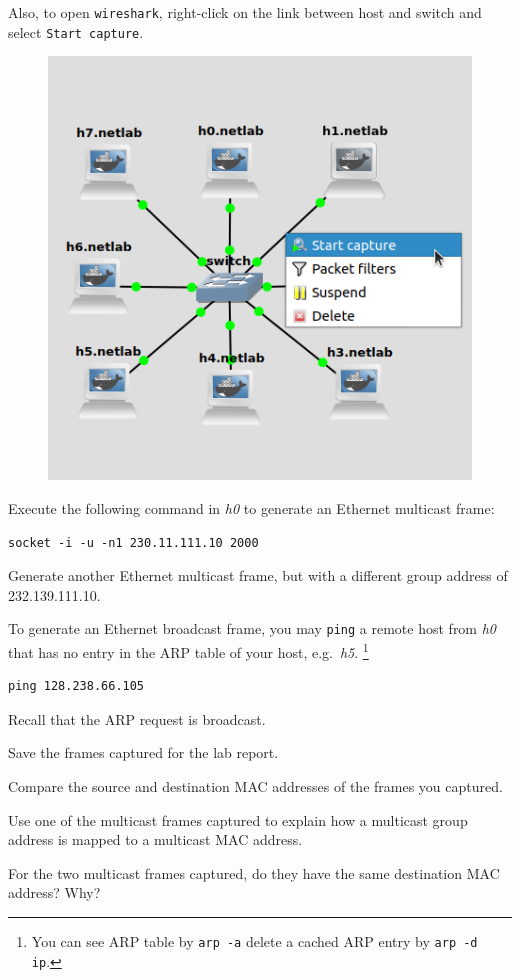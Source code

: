 \documentclass{../UTNetLab}
\begin{document}
    Also, to open \lstinline{wireshark}, right-click on the link between host and switch and select \texttt{Start capture}.
    \begin{figure}[H]
        \centering
        \includegraphics[scale=1.6]{img/capture}
    \end{figure}

    Execute the following command in \textit{h0} to generate an Ethernet multicast frame:
    \begin{lstlisting}[emph={your-host, remote-host}]
socket -i -u -n1 230.11.111.10 2000
    \end{lstlisting}

    Generate another Ethernet multicast frame, but with a different group address of {232.139.111.10}.

    To generate an Ethernet broadcast frame, you may \lstinline{ping} a remote host from \textit{h0} that has no entry in the ARP table of your host, e.g.\ \textit{h5}.
    \footnote{You can see ARP table by \lstinline{arp -a} delete a cached ARP entry by \lstinline[emph={ip}]{arp -d ip}.}
    \begin{lstlisting}
ping 128.238.66.105
    \end{lstlisting}
    Recall that the ARP request is broadcast.%

    Save the frames captured for the lab report.

    \begin{report}
    \item Compare the source and destination MAC addresses of the frames you captured.

    \item Use one of the multicast frames captured to explain how a multicast group address is mapped to a multicast MAC address.

    For the two multicast frames captured, do they have the same destination MAC address?
    Why?
    \end{report}
\end{document}
